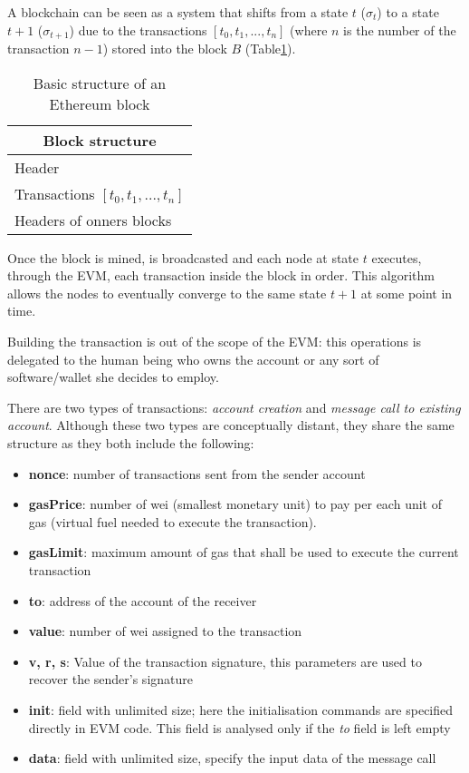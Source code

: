 A blockchain can be seen as a system that shifts from a state $t$ ($\sigma_t$) to a state $t+1$ ($\sigma_{t+1}$) due to the transactions $[t_0,t_1,...,t_n]$ (where $n$ is the number of the transaction $n-1$) stored into the block $B$ (Table\ref{table:2}).


\begin{table}[h!]
\centering
\caption{Basic structure of an Ethereum block}
\begin{tabular}{ |p{3cm}|  }
\hline
\multicolumn{1}{|c|}{Block structure} \\
\hline
\hline
Header \\
\hline
Transactions $[t_0,t_1,...,t_n]$ \\
\hline
Headers of onners blocks\\
\hline
\end{tabular}
\label{table:2}
\end{table}

Once the block is mined, is broadcasted and each node at state $t$  executes, through the EVM, each transaction inside the block in order.
This algorithm allows the nodes to eventually converge to the same state $t+1$ at some point in time.

Building the transaction is out of the scope of the EVM: this operations is delegated to the human being who owns the account or any sort of software/wallet she decides to employ.

There are two types of transactions: \textit{account creation} and \textit{message call to existing account}. Although these two types are conceptually distant, they share the same structure as they both include the following:

\begin{itemize}
  \item \textbf{nonce}: number of transactions sent from the sender account
  \item \textbf{gasPrice}: number of wei (smallest monetary unit) to pay per each unit of gas (virtual fuel needed to execute the transaction).
  \item \textbf{gasLimit}: maximum amount of gas that shall be used to execute the current transaction
  \item \textbf{to}: address of the account of the receiver
  \item \textbf{value}: number of wei assigned to the transaction
  \item \textbf{v, r, s}: Value of the transaction signature, this parameters are used to recover the sender's signature \cite{gura2004comparing}
  \item \textbf{init}: field with unlimited size; here the initialisation commands are specified directly in EVM code. This field is analysed only if the \textit{to} field is left empty
  \item \textbf{data}: field with unlimited size, specify the input data of the message call
\end{itemize}

